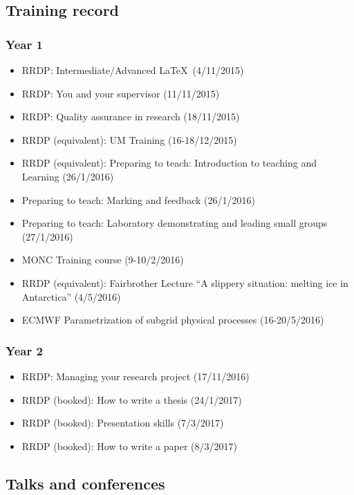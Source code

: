 \documentclass[11pt,a4paper]{article}
\begin{document}
\subsection*{Training record}
\subsubsection*{Year 1}

\begin{itemize}
  \item RRDP: Intermediate/Advanced \LaTeX\ (4/11/2015)
  \item RRDP: You and your supervisor (11/11/2015)
  \item RRDP: Quality assurance in research (18/11/2015)
  \item RRDP (equivalent): UM Training (16-18/12/2015)
  \item RRDP (equivalent): Preparing to teach: Introduction to teaching and Learning (26/1/2016)
  \item Preparing to teach: Marking and feedback (26/1/2016)
  \item Preparing to teach: Laboratory demonstrating and leading small groups (27/1/2016)
  \item MONC Training course (9-10/2/2016)
  \item RRDP (equivalent): Fairbrother Lecture ``A slippery situation: melting ice in Antarctica'' (4/5/2016)
  \item ECMWF Parametrization of subgrid physical processes (16-20/5/2016)
\end{itemize}

\subsubsection*{Year 2}

\begin{itemize}
  \item RRDP: Managing your research project (17/11/2016)
  \item RRDP (booked): How to write a thesis (24/1/2017)
  \item RRDP (booked): Presentation skills (7/3/2017)
  \item RRDP (booked): How to write a paper (8/3/2017)
\end{itemize}

\subsection*{Talks and conferences}
\end{document}
